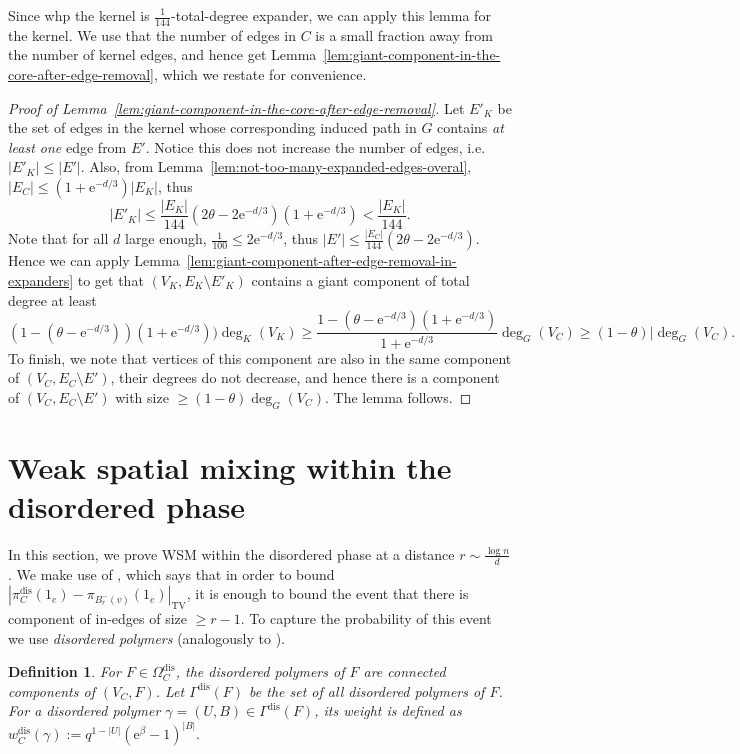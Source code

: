 \documentclass[11pt]{article}
\theoremstyle{plain}
\newtheorem{definition}[theorem]{Definition}
\newcommand{\emm}{\mathrm{e}}
\newcommand{\TV}{\mathrm{TV}}
\newcommand{\1}{\mathbb{1}}
\newcommand{\dis}{\mathrm{dis}}
\begin{document}
Since whp the kernel is \(\tfrac{1}{144}\)-total-degree expander, we can apply this lemma for the kernel. We use that the number of edges in \(C\) is a small fraction away from the number of kernel edges, and hence get Lemma~\ref{lem:giant-component-in-the-core-after-edge-removal}, which we restate for convenience.

\giantafterremoval*
\begin{proof}[Proof of Lemma~\ref{lem:giant-component-in-the-core-after-edge-removal}]
    Let \(E'_K\) be the set of edges in the kernel whose corresponding induced path in \(G\) contains \textit{at least one} edge from \(E'\). Notice this does not increase the number of edges, i.e. \(|E'_K|\leq |E'|\). Also, from Lemma~\ref{lem:not-too-many-expanded-edges-overal}, \(|E_C|\leq (1+\emm^{-d/3})|E_K|\), thus
    \[
    |E'_K|\leq \frac{|E_K|}{144}(2\theta-2\emm^{-d/3})(1+\emm^{-d/3}) < \frac{|E_K|}{144}.
    \]
    Note that for all \(d\) large enough, \(\tfrac{1}{100}\leq 2\emm^{-d/3}\), thus \(|E'|\leq \frac{|E_C|}{144}(2\theta-2\emm^{-d/3})\).
    Hence we can apply Lemma~\ref{lem:giant-component-after-edge-removal-in-expanders} to get that \((V_K,E_K\setminus E'_K)\) contains a giant component of total degree at least
    \[
    (1 - (\theta - \emm^{-d/3}))(1+\emm^{-d/3}))\deg_K(V_K) \geq \frac{1 - (\theta - \emm^{-d/3})(1+\emm^{-d/3})}{1+\emm^{-d/3}} \deg_G(V_C)\geq (1-\theta)|\deg_G(V_C).
    \]
    To finish, we note that vertices of this component are also in the same component of \((V_C,E_C\setminus E')\), their degrees do not decrease, and hence there is a component of \((V_C,E_C\setminus E')\) with size \(\geq (1-\theta)\deg_G(V_C)\). The lemma follows.
\end{proof}

\section{Weak spatial mixing within the disordered phase}\label{sec:disordered}

In this section, we prove WSM within the disordered phase at a distance \(r\sim \frac{\log n}{d}\). We make use of \cite[Lemma 5.3]{blanca2021random}, which says that in order to bound \(|\pi^\dis_C(1_e) - \pi_{B_r^-(v)}(1_e)|_\TV\), it is enough to bound the event that there is component of in-edges of size \(\geq r-1\). To capture the probability of this event we use \textit{disordered polymers} (analogously to \cite{RCM-Helmuth2020}).
\begin{definition}
    For \(F\in\Omega^\dis_C\), the \emph{disordered polymers} of \(F\) are \emph{connected components} of \((V_C,F)\). Let \(\Gamma^\dis(F)\) be the set of all disordered polymers of \(F\).
    For a disordered polymer \(\gamma = (U, B)\in\Gamma^\dis(F)\), its \textit{weight} is defined as $  w^\dis_C(\gamma) := q^{1-|U|} (\emm^\beta-1)^{|B|}.$
\end{definition}
\end{document}

